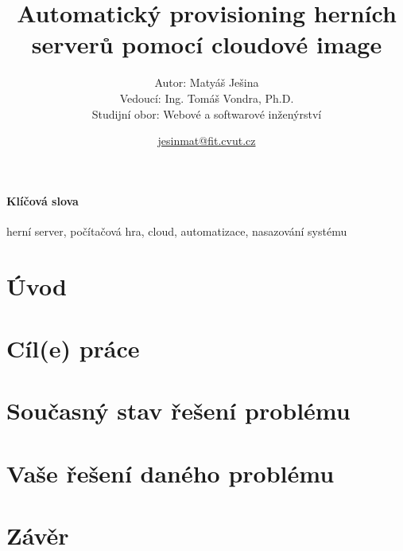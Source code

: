 \documentclass{article}
\title{Automatický provisioning herních serverů pomocí cloudové image} %
\author{\small Autor: Matyáš Ješina\\\small Vedoucí: Ing. Tomáš Vondra, Ph.D.\\ \small Studijní obor: Webové a softwarové inženýrství} %
\date{\small \url{jesinmat@fit.cvut.cz}} %
\begin{document}
\maketitle              

\paragraph{Klíčová slova}{herní server, počítačová hra, cloud, automatizace, nasazování systému}

\section{Úvod}

\section{Cíl(e) práce}

\section{Současný stav řešení problému}

\section{Vaše řešení daného problému}

\section{Závěr}


\printbibliography

\end{document}
